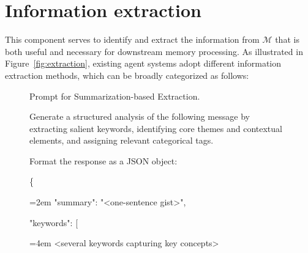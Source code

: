 \section{Information extraction}
\label{sec:mem_extraction}







This component serves to identify and extract the information from $\mathcal{M}$ that is both useful and necessary for downstream memory processing.
As illustrated in Figure~\ref{fig:extraction}, existing agent systems adopt different information extraction methods, which can be broadly categorized as follows:


\begin{figure}[h]
\centering
\setlength{\abovecaptionskip}{0cm}
\begin{AIbox}{Prompt for Summarization-based Extraction.}
{
\begin{tcolorbox}[colback=gray!10, colframe=gray!10, boxrule=0pt, sharp corners, left=0pt, right=0pt]
Generate a structured analysis of the following message by extracting salient keywords, identifying core themes and contextual elements, and assigning relevant categorical tags.




Format the response as a JSON object: 

{\ttfamily
\{
    
    {\hangindent=2em  "summary": "<one-sentence gist>", \par}
        
        
        
    
    \hspace*{2em}"keywords": [
    
        {\hangindent=4em  <several keywords capturing key concepts> \par}

}
\end{tcolorbox}}
\end{AIbox}
\end{figure}
